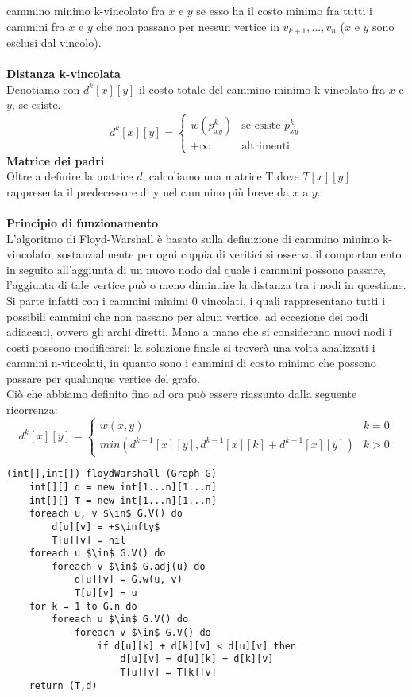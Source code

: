\documentclass[../cheatSheetAlgoritmi.tex]{subfiles}
\begin{document}
cammino minimo k-vincolato fra $x$ e $y$ se esso ha il costo minimo fra tutti i cammini fra $x$ e $y$ che non passano per nessun vertice in $v_{k+1} , . . . , v_n$ ($x$ e $y$ sono esclusi dal vincolo). \\\\
\textbf{Distanza k-vincolata} \\
Denotiamo con $d^{k}[x][y]$ il costo totale del cammino minimo k-vincolato fra $x$ e $y$, se esiste.
\[
  d^{k}[x][y]=\begin{cases}
               w(p^{k}_{xy}) & \text{se esiste }p^{k}_{xy}\\
               +\infty & \text{altrimenti}
            \end{cases}
\]
\textbf{Matrice dei padri} \\
Oltre a definire la matrice $d$, calcoliamo una matrice T dove $T[x][y]$ rappresenta il predecessore di y nel cammino più breve da $x$ a $y$. \\\\
\textbf{Principio di funzionamento} \\
L'algoritmo di Floyd-Warshall è basato sulla definizione di cammino minimo k-vincolato, sostanzialmente per ogni coppia di veritici si osserva il comportamento in seguito all'aggiunta di un nuovo nodo dal quale i cammini possono passare, l'aggiunta di tale vertice può o meno diminuire la distanza tra i nodi in questione. Si parte infatti con i cammini minimi 0 vincolati, i quali rappresentano tutti i possibili cammini che non passano per alcun vertice, ad eccezione dei nodi adiacenti, ovvero gli archi diretti. Mano a mano che si considerano nuovi nodi i costi possono modificarsi; la soluzione finale si troverà  una volta analizzati i cammini n-vincolati, in quanto sono i cammini di costo minimo che possono passare per qualunque vertice del grafo. \\
Ciò che abbiamo definito fino ad ora può essere riassunto dalla seguente ricorrenza: \\
\[
  d^{k}[x][y]=\begin{cases}
               w(x, y) & k = 0\\
               min(d^{k-1}[x][y], d^{k-1}[x][k] + d^{k-1}[x][y]) & k > 0
            \end{cases}
\]
\begin{lstlisting}[caption=Algoritmo di Floyd e Warshall cammini minimi a sorgente multipla]
(int[],int[]) floydWarshall (Graph G)
	int[][] d = new int[1...n][1...n]
	int[][] T = new int[1...n][1...n]
	foreach u, v $\in$ G.V() do
		d[u][v] = +$\infty$
		T[u][v] = nil
	foreach u $\in$ G.V() do
		foreach v $\in$ G.adj(u) do
			d[u][v] = G.w(u, v)
			T[u][v] = u
	for k = 1 to G.n do
		foreach u $\in$ G.V() do
			foreach v $\in$ G.V() do
				if d[u][k] + d[k][v] < d[u][v] then
					d[u][v] = d[u][k] + d[k][v]
					T[u][v] = T[k][v]
	return (T,d)
\end{lstlisting}
\end{document}
